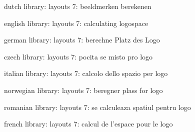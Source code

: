 

\unprotect

\startmessages  dutch  library: layouts
      7: beeldmerken berekenen
\stopmessages

\startmessages  english  library: layouts
      7: calculating logospace
\stopmessages

\startmessages  german  library: layouts
      7: berechne Platz des Logo
\stopmessages

\startmessages  czech  library: layouts
      7: pocita se misto pro logo
\stopmessages

\startmessages  italian  library: layouts
      7: calcolo dello spazio per logo
\stopmessages

\startmessages  norwegian  library: layouts
      7: beregner plass for logo
\stopmessages

\startmessages  romanian  library: layouts
      7: se calculeaza spatiul pentru logo
\stopmessages

\startmessages  french  library: layouts
      7: calcul de l'espace pour le logo
\stopmessages



\newif\ifnewlogos

